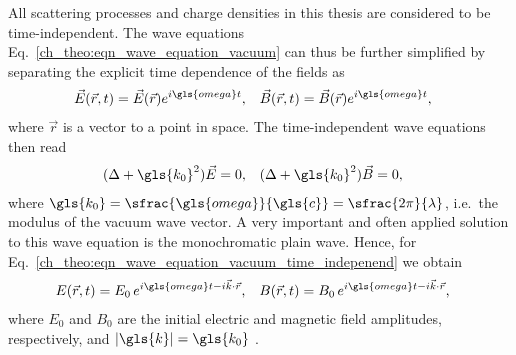 All scattering processes and charge densities in this thesis are considered to be time-independent. The wave equations Eq.~\eqref{ch_theo:eqn_wave_equation_vacuum} can thus be further simplified by separating the explicit time dependence of the fields as
\begin{align}
\vec{E}(\vec{r},t) &= \vec{E}(\vec{r}) e^{i \gls{omega} t}\text{,} & \vec{B}(\vec{r},t) &= \vec{B}(\vec{r}) e^{i \gls{omega} t}\text{,}
\end{align}
where $\vec{r}$ is a vector to a point in space. The time-independent wave equations then read
\begin{align}
(\Delta  + \gls{k_0}^2 ) \vec{E} &= 0\text{,}& (\Delta  + \gls{k_0}^2 ) \vec{B} &= 0\text{,} \label{ch_theo:eqn_wave_equation_vacuum_time_indepenend}
\end{align}
where $\gls{k_0}= \sfrac{\gls{omega}}{\gls{c}} = \sfrac{2 \pi}{\lambda}$, i.e.~the modulus of the vacuum wave vector. A very important and often applied solution to this wave equation is the monochromatic plain wave. Hence, for Eq.~\eqref{ch_theo:eqn_wave_equation_vacuum_time_indepenend} we obtain
\begin{align}
E(\vec{r},t) &= E_0 \, e^{i \gls{omega} t - i \vec{k} \cdot \vec{r}}\text{,} & B(\vec{r},t) &= B_0 \, e^{i \gls{omega} t - i \vec{k} \cdot \vec{r}}\text{,} \label{ch_theo:eqn_plain_wave}
\end{align}
where $E_0$ and $B_0$ are the initial electric and magnetic field amplitudes, respectively, and $|\gls{k}| = \gls{k_0}$ \cite{born_principles_1965}.

